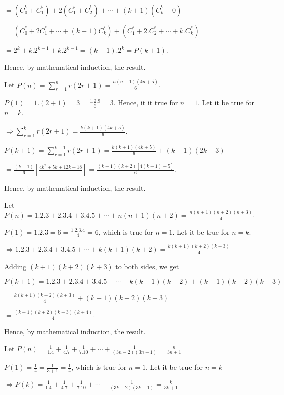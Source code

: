   $= (C_0^^k + C_1^^k) + 2(C_1^^k + C_2^^k) + \cdots + (k + 1)(C_k^^k + 0)$

  $= (C_0^^k + 2C_1^^k + \cdots + (k + 1)C_k^^k) + (C_1^^k + 2.C_2^^k + \cdots + k.C_k^^k)$

  $= 2^k + k.2^{k - 1} + k.2^{k - 1} = (k + 1).2^k = P(k + 1)$.

  Hence, by mathematical induction, the result.
\item Let $P(n) = \displaystyle\sum_{r = 1}^nr(2r + 1) = \frac{n(n + 1)(4n + 5)}{6}$.

  $P(1) = 1.(2 + 1) = 3 = \frac{1.2.9}{6} = 3$. Hence, it it true for $n = 1$. Let it be true for $n = k$.

  $\Rightarrow \displaystyle\sum_{r = 1}^kr(2r + 1) = \frac{k(k + 1)(4k + 5)}{6}$.

  $P(k + 1) = \displaystyle\sum_{r = 1}^{k + 1}r(2r + 1) = \frac{k(k + 1)(4k + 5)}{6} + (k + 1)(2k + 3)$

  $= \frac{(k + 1)}{6}\left[\frac{4k^2 + 5k + 12k + 18}{}\right] = \frac{(k + 1)(k + 2)[4(k + 1) + 5]}{6}$.

  Hence, by mathematical induction, the result.
\item Let $P(n) = 1.2.3 + 2.3.4 + 3.4.5 + \cdots + n(n + 1)(n + 2) = \frac{n(n + 1)(n + 2)(n + 3)}{4}$.

  $P(1) = 1.2.3 = 6 = \frac{1.2.3.4}{4} = 6$, which is true for $n = 1$. Let it be true for $n = k$.

  $\Rightarrow 1.2.3 + 2.3.4 + 3.4.5 + \cdots + k(k + 1)(k + 2) = \frac{k(k + 1)(k + 2)(k + 3)}{4}$

  Adding $(k + 1)(k + 2)(k + 3)$ to both sides, we get

  $P(k + 1) = 1.2.3 + 2.3.4 + 3.4.5 + \cdots + k(k + 1)(k + 2) + (k + 1)(k + 2)(k + 3)$

  $= \frac{k(k + 1)(k + 2)(k + 3)}{4} + (k + 1)(k + 2)(k + 3)$

  $= \frac{(k + 1)(k + 2)(k + 3)(k + 4)}{4}$.

  Hence, by mathematical induction, the result.
\item Let $P(n) = \frac{1}{1.4} + \frac{1}{4.7} + \frac{1}{7.10} + \cdots + \frac{1}{(3n - 2)(3n + 1)} =
  \frac{n}{3n + 1}$

  $P(1) = \frac{1}{4} = \frac{1}{3 + 1} = \frac{1}{4}$, which is true for $n = 1$. Let it be true for $n =
  k$

  $\Rightarrow P(k) = \frac{1}{1.4} + \frac{1}{4.7} + \frac{1}{7.10} + \cdots + \frac{1}{(3k - 2)(3k + 1)} =
  \frac{k}{3k + 1}$


